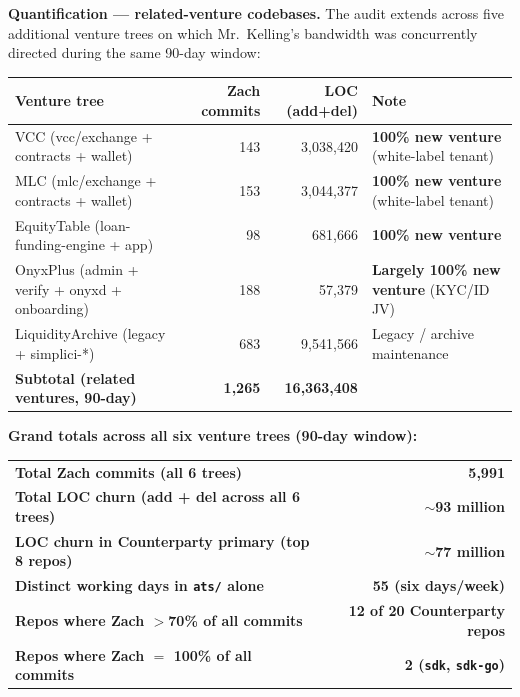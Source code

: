 \documentclass[11pt,letterpaper]{article}
\begin{document}
\textbf{Quantification --- related-venture codebases.} The audit
extends across five additional venture trees on which Mr.\ Kelling's
bandwidth was concurrently directed during the same 90-day window:

\begin{center}
\begin{small}
\begin{tabular}{lrrl}
\toprule
\textbf{Venture tree} & \textbf{Zach commits} & \textbf{LOC (add+del)} & \textbf{Note} \\
\midrule
VCC (vcc/exchange + contracts + wallet)        & 143 & 3{,}038{,}420 & \textbf{100\% new venture} (white-label tenant) \\
MLC (mlc/exchange + contracts + wallet)        & 153 & 3{,}044{,}377 & \textbf{100\% new venture} (white-label tenant) \\
EquityTable (loan-funding-engine + app)        & 98  & 681{,}666     & \textbf{100\% new venture} \\
OnyxPlus (admin + verify + onyxd + onboarding) & 188 & 57{,}379      & \textbf{Largely 100\% new venture} (KYC/ID JV) \\
LiquidityArchive (legacy + simplici-*)         & 683 & 9{,}541{,}566 & Legacy / archive maintenance \\
\midrule
\textbf{Subtotal (related ventures, 90-day)}   & \textbf{1{,}265} & \textbf{16{,}363{,}408} & \\
\bottomrule
\end{tabular}
\end{small}
\end{center}

\textbf{Grand totals across all six venture trees (90-day window):}

\begin{center}
\begin{tabular}{lr}
\toprule
\textbf{Total Zach commits (all 6 trees)} & \textbf{5{,}991} \\
\textbf{Total LOC churn (add + del across all 6 trees)} & \textbf{$\sim$93 million} \\
\textbf{LOC churn in Counterparty primary (top 8 repos)} & \textbf{$\sim$77 million} \\
\textbf{Distinct working days in \texttt{ats/} alone} & \textbf{55 (six days/week)} \\
\textbf{Repos where Zach $>$70\% of all commits} & \textbf{12 of 20 Counterparty repos} \\
\textbf{Repos where Zach $=$ 100\% of all commits} & \textbf{2 (\texttt{sdk}, \texttt{sdk-go})} \\
\bottomrule
\end{tabular}
\end{center}
\end{document}
